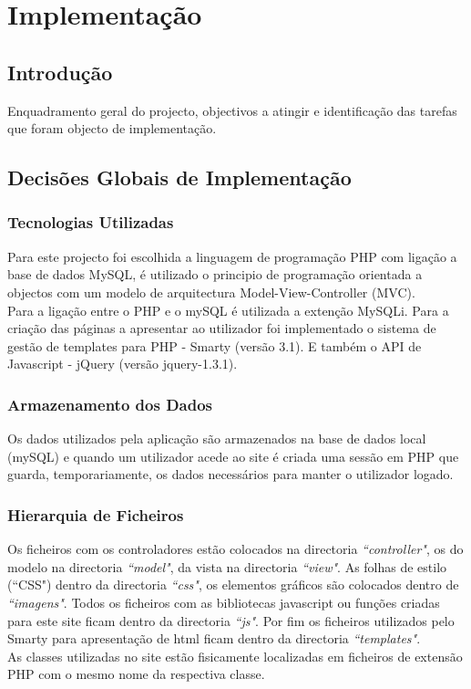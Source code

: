 \chapter{Implementação}

\section{Introdução}

Enquadramento geral do projecto, objectivos a atingir e identificação das tarefas que foram objecto de implementação.

\section{Decisões Globais de Implementação}

\subsection{Tecnologias Utilizadas}
Para este projecto foi escolhida a linguagem de programação PHP com ligação a base de dados MySQL, é utilizado o principio de programação orientada a objectos com um modelo de arquitectura Model-View-Controller (MVC).\\
Para a ligação entre o PHP e o mySQL é utilizada a extenção MySQLi.
Para a criação das páginas a apresentar ao utilizador foi implementado o sistema de gestão de templates para PHP - Smarty (versão 3.1). E também o API de Javascript - jQuery (versão jquery-1.3.1).

\subsection{Armazenamento dos Dados}
Os dados utilizados pela aplicação são armazenados na base de dados local (mySQL) e quando um utilizador acede ao site é criada uma sessão em PHP que guarda, temporariamente, os dados necessários para manter o utilizador logado.

\subsection{Hierarquia de Ficheiros}
Os ficheiros com os controladores estão colocados na directoria \textit{``controller"}, os do modelo na directoria \textit{``model"}, da vista na directoria \textit{``view"}. As folhas de estilo (``CSS") dentro da directoria \textit{``css"}, os elementos gráficos são colocados dentro de \textit{``imagens"}. Todos os ficheiros com as bibliotecas javascript ou funções criadas para este site ficam dentro da directoria \textit{``js"}. Por fim os ficheiros utilizados pelo Smarty para apresentação de html ficam dentro da directoria \textit{``templates"}.\\
As classes utilizadas no site estão fisicamente localizadas em ficheiros de extensão PHP com o mesmo nome da respectiva classe.


